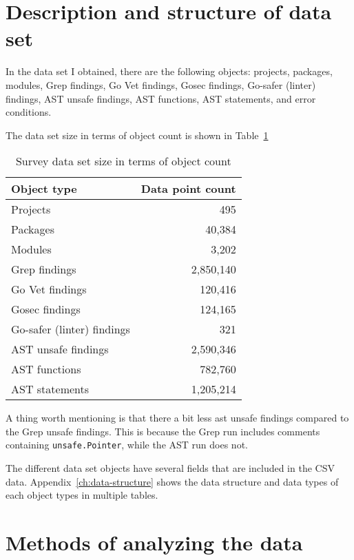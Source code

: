 \section{Description and structure of data set}\label{sec:survey-dataset}

In the data set I obtained, there are the following objects: projects, packages, modules,  Grep findings, Go Vet findings,
Gosec findings, Go-safer (linter) findings, AST unsafe findings, AST functions, AST statements, and error conditions.

The data set size in terms of object count is shown in Table~\ref{tbl:survey-dataset-size}

\begin{table}[h]
    \centering
    \caption{Survey data set size in terms of object count}
    \label{tbl:survey-dataset-size}
    \begin{tabular}{lr}
        \toprule
        Object type & Data point count \\
        \midrule
        Projects & 495 \\
        Packages & 40,384 \\
        Modules & 3,202 \\
        Grep findings & 2,850,140 \\
        Go Vet findings & 120,416 \\
        Gosec findings & 124,165 \\
        Go-safer (linter) findings & 321 \\
        AST unsafe findings & 2,590,346 \\
        AST functions & 782,760 \\
        AST statements & 1,205,214 \\
        \bottomrule
    \end{tabular}
\end{table}

A thing worth mentioning is that there a bit less \acrshort{ast} unsafe findings compared to the Grep unsafe findings.
This is because the Grep run includes comments containing \texttt{unsafe.Pointer}, while the AST run does not.

The different data set objects have several fields that are included in the CSV data.
Appendix~\ref{ch:data-structure} shows the data structure and data types of each object types in multiple tables.



\section{Methods of analyzing the data}\label{sec:survey-analysis-methods}


